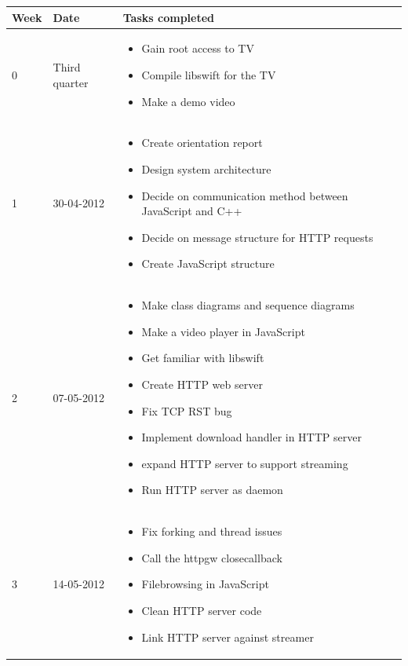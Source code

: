 \begin{table}
\centering
	\begin{tabular}{| l | l | p{8 cm} |}
		\hline
		Week & Date & Tasks completed \\
		\hline
		\hline
		0 & Third quarter & 	\begin{itemize}
								\item Gain root access to TV
								\item Compile libswift for the TV
								\item Make a demo video
							\end{itemize} \\
		\hline
		1 & 30-04-2012 & 	\begin{itemize}
								\item Create orientation report								
								\item Design system architecture
								\item Decide on communication method between JavaScript and C++
								\item Decide on message structure for HTTP requests
								\item Create JavaScript structure
							\end{itemize} \\
		\hline
		2 & 07-05-2012 &		\begin{itemize}
								\item Make class diagrams and sequence diagrams
								\item Make a video player in JavaScript
								\item Get familiar with libswift
								\item Create HTTP web server
								\item Fix TCP RST bug
								\item Implement download handler in HTTP server
								\item expand HTTP server to support streaming
								\item Run HTTP server as daemon
							\end{itemize} \\
		\hline
		3 & 14-05-2012 &		\begin{itemize}
								\item Fix forking and thread issues
								\item Call the httpgw closecallback
								\item Filebrowsing in JavaScript
								\item Clean HTTP server code
								\item Link HTTP server against streamer

\end{itemize}
\end{tabular}
\end{table}

